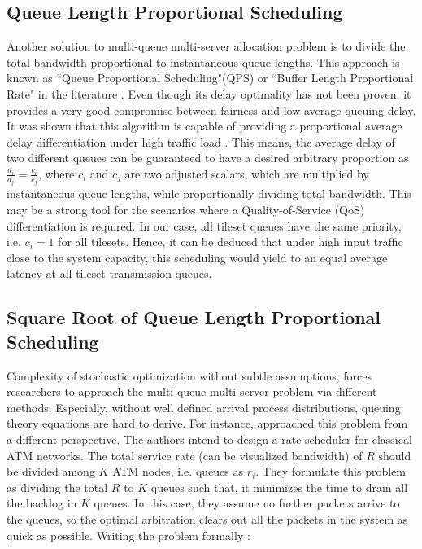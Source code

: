 \subsection{Queue Length Proportional Scheduling}


Another solution to multi-queue multi-server allocation problem is to divide the total bandwidth proportional to instantaneous queue lengths. This approach is known as ``Queue Proportional Scheduling"(QPS) or ``Buffer Length Proportional Rate" in the literature \cite{dovrolis1999proportional}. Even though its delay optimality has not been proven, it provides a very good compromise between fairness and low average queuing delay. It was shown that this algorithm is capable of providing a proportional average delay differentiation under high traffic load \cite{dovrolis1999proportional}. This means, the average delay of two different queues can be guaranteed to have a desired arbitrary proportion as $\frac{d_{i}}{d_{j}} = \frac{c_{i}}{c_{j}} $, where $c_{i}$ and $c_{j}$ are two adjusted scalars, which are multiplied by instantaneous queue lengths, while proportionally dividing total bandwidth. This may be a strong tool for the scenarios where a Quality-of-Service (QoS) differentiation is required. In our case, all tileset queues have the same priority, i.e. $c_{i} = 1$ for all tilesets. Hence, it can be deduced that under high input traffic close to the system capacity, this scheduling would yield to an equal average latency at all tileset transmission queues. 


\subsection{Square Root of Queue Length Proportional Scheduling}

Complexity of stochastic optimization without subtle assumptions, forces researchers to approach the multi-queue multi-server problem via different methods. Especially, without well defined arrival process distributions, queuing theory equations are hard to derive. For instance, \cite{ngin1999generalised} approached this problem from a different perspective. The authors intend to design a rate scheduler for classical ATM networks. The total service rate (can be visualized bandwidth) of $R$ should be divided among $K$ ATM nodes, i.e. queues as $r_{i}$. They formulate this problem as dividing the total $R$ to $K$ queues such that, it minimizes the time to drain all the backlog in $K$ queues. In this case, they assume no further packets arrive to the queues, so the optimal arbitration clears out all the packets in the system as quick as possible. Writing the problem formally :

